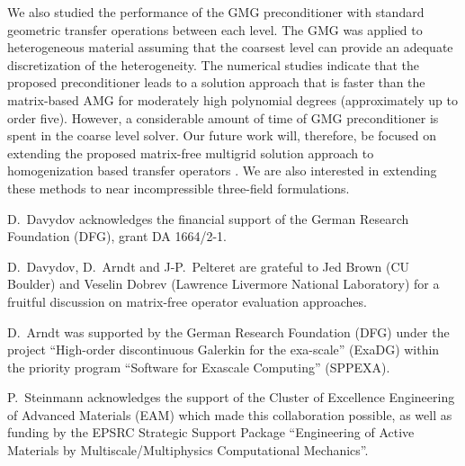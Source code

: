 \documentclass[times,doublespace]{nmeauth}
\begin{document}
We also studied the performance of the GMG preconditioner with standard geometric transfer operations between each level.
The GMG was applied to heterogeneous material assuming that the coarsest level can provide an adequate discretization of the heterogeneity.
The numerical studies indicate that the proposed preconditioner leads to a solution approach that is faster than the matrix-based AMG for moderately high polynomial degrees (approximately up to order five).
However, a considerable amount of time of GMG preconditioner is spent in the coarse level solver.
Our future work will, therefore, be focused on extending the proposed matrix-free multigrid solution approach to homogenization based transfer operators \cite{Miehe2007}.
We are also interested in extending these methods to near incompressible three-field formulations.

\acks

D.~Davydov acknowledges the financial support of the German Research Foundation (DFG), grant DA 1664/2-1.

D.~Davydov, D.~Arndt and J-P.~Pelteret are grateful to Jed Brown (CU Boulder) and Veselin Dobrev (Lawrence Livermore National Laboratory) for a fruitful discussion on matrix-free operator evaluation approaches.

D.~Arndt was supported by the German Research Foundation (DFG) under the project ``High-order discontinuous
Galerkin for the exa-scale'' (\mbox{ExaDG}) within the priority program ``Software
for Exascale Computing'' (SPPEXA).


P.~Steinmann acknowledges the support of the Cluster of Excellence Engineering of Advanced Materials (EAM) which made this collaboration possible, as well as funding by the EPSRC Strategic Support Package ``Engineering of Active Materials by Multiscale/Multiphysics Computational Mechanics''.



% 


\end{document}
